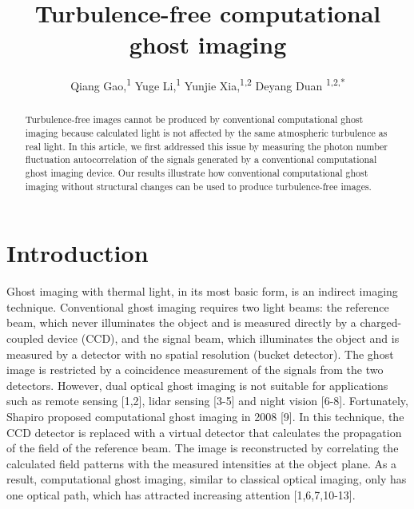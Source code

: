 \documentclass[letterpaper,10pt]{article}
\newcommand\authormark[1]{\textsuperscript{#1}}
\begin{document}
\title{Turbulence-free computational ghost imaging}


\author{Qiang Gao,\authormark{1} Yuge Li,\authormark{1} Yunjie Xia,\authormark{1,2} Deyang Duan \authormark{1,2,*}}

\address{\authormark{1} School of Physics and Physical Engineering, Qufu Normal University, Qufu 273165, China\\
\authormark{2}Shandong Provincial Key Laboratory of Laser Polarization and Information
Technology, Research Institute of Laser, Qufu Normal University, Qufu 273165, China}

\email{\authormark{*}duandy2015@qfnu.edu.cn} %



\begin{abstract}
Turbulence-free images cannot be produced by conventional computational ghost
imaging because
calculated light is not affected by the same atmospheric turbulence as
real light. In this article, we first addressed this issue
by measuring the photon number fluctuation autocorrelation of the signals
generated by a conventional computational ghost imaging device. Our results
illustrate how conventional computational ghost imaging without
structural changes can be used to produce turbulence-free images.
\end{abstract}

\section{Introduction}
Ghost imaging with thermal light, in its most basic form, is an indirect
imaging technique. Conventional ghost imaging requires two light beams: the
reference beam, which never illuminates the object and is measured directly
by a charged-coupled device (CCD), and the signal beam, which illuminates
the object and is measured by a detector with no spatial resolution (bucket
detector). The ghost image is restricted by a coincidence measurement of the
signals from the two detectors. However, dual optical ghost imaging is not
suitable for applications such as remote sensing [1,2], 
lidar sensing [3-5] and night vision [6-8]. Fortunately, Shapiro proposed computational ghost
imaging in 2008 [9]. In this technique, the CCD detector is
replaced with a virtual detector that calculates the propagation of the
field of the reference beam. The image is reconstructed by correlating the
calculated field patterns with the measured intensities at the object plane.
As a result, computational ghost imaging, similar to classical optical
imaging, only has one optical path, which has attracted increasing attention [1,6,7,10-13].
\end{document}
